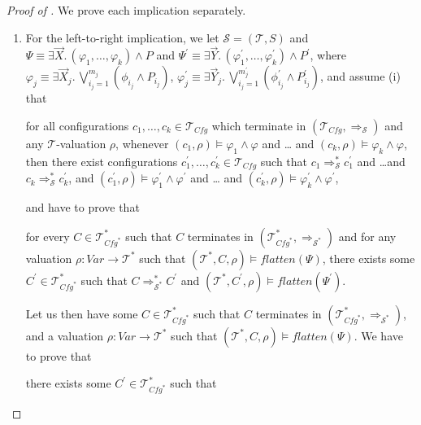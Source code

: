 \documentclass{article}
\newcommand{\Var}{\mathit{Var}}
\newcommand{\Tcfg}{\mathcal{T}_{\mathit{Cfg}}}
\newenvironment{proofenv}
  {
    \VerbatimEnvironment\begin{tcolorbox}[colback=black!0!white] %
  }
  {
   \end{tcolorbox}
  }
\begin{document}
\begin{proof}[Proof of ]
We prove each implication separately.
\begin{enumerate}
    \item For the left-to-right implication, we
    let $\mathcal{S} = (\mathcal{T}, S)$
    and $\Psi \equiv  \exists \vec{X}.\, (\varphi_1,\ldots,\varphi_k) \land P$
    and $\Psi^\prime \equiv \exists \vec{Y}.\, (\varphi_1^\prime,\ldots,\varphi_k^\prime) \land P^\prime$,
    where $\varphi_j \equiv \exists \vec{X}_j.\, \bigvee_{i_j = 1}^{m_j} (\phi_{i_j} \land P_{i_j})$,
    $\varphi^\prime_j \equiv \exists \vec{Y}_j.\, \bigvee_{i_j = 1}^{m^\prime_j} (\phi^\prime_{i_j} \land P^\prime_{i_j})$,
    and assume (i) that
    \begin{proofenv}
    for all configurations $c_1,\ldots,c_k \in \Tcfg$
    which terminate in $(\Tcfg, \Rightarrow_{\mathcal{S}})$
    and any $\mathcal{T}$-valuation $\rho$,
    whenever $(c_1,\rho) \vDash \varphi_1 \land \varphi$ and \ldots
    and $(c_k,\rho) \vDash \varphi_k \land \varphi$,
    then there exist configurations $c_1^\prime,\ldots,c_k^\prime \in \Tcfg$
    such that $c_1 \Rightarrow^{*}_{\mathcal{S}} c_1^\prime$
    and \ldots and $c_k \Rightarrow^{*}_{\mathcal{S}} c_k^\prime$,
    and
    $(c_1^\prime,\rho) \vDash \varphi^\prime_1 \land \varphi^\prime$ and \ldots
    and $(c_k^\prime, \rho) \vDash \varphi^\prime_k \land \varphi^\prime$,
    \end{proofenv}
    and have to prove that
    \begin{proofenv}
    for every $C \in \mathcal{T}^*_{\mathit{Cfg}^*}$
    such that $C$ terminates in $(\mathcal{T}^*_{\mathit{Cfg}^*}, \Rightarrow_{\mathcal{S}^*})$
    and for any valuation $\rho : \Var \to \mathcal{T}^*$
    such that $(\mathcal{T}^*, C, \rho) \vDash \mathit{flatten}(\Psi)$,
    there exists some $C^\prime \in \mathcal{T}^*_{\mathit{Cfg}^*}$
    such that
    $C \Rightarrow^{*}_{\mathcal{S}^*} C^\prime$
    and $(\mathcal{T}^*, C^\prime, \rho) \vDash \mathit{flatten}(\Psi^\prime)$.
    \end{proofenv}
    Let us then have some $C \in \mathcal{T}^*_{\mathit{Cfg}^*}$
    such that $C$ terminates in $(\mathcal{T}^*_{\mathit{Cfg}^*}, \Rightarrow_{\mathcal{S}^*})$,
    and a valuation $\rho : \Var \to \mathcal{T}^*$
    such that $(\mathcal{T}^*, C, \rho) \vDash \mathit{flatten}(\Psi)$.
    We have to prove that
    \begin{proofenv}
    there exists some $C^\prime \in \mathcal{T}^*_{\mathit{Cfg}^*}$
    such that

\end{proofenv}
\end{enumerate}
\end{proof}
\end{document}
